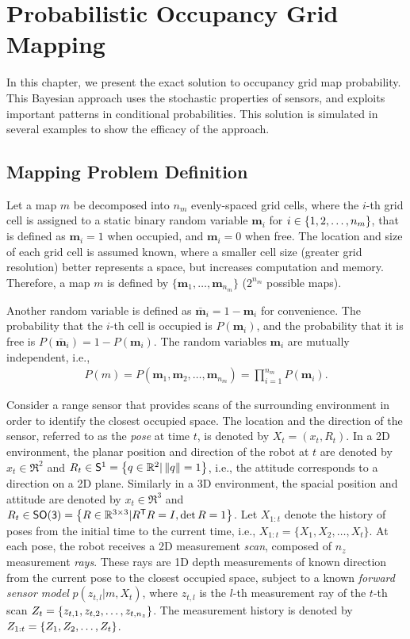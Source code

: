 
\chapter{Probabilistic Occupancy Grid Mapping} \label{chap:pogm}

In this chapter, we present the exact solution to occupancy grid map probability. This Bayesian approach uses the stochastic properties of sensors, and exploits important patterns in conditional probabilities. This solution is simulated in several examples to show the efficacy of the approach.

\section{Mapping Problem Definition}

Let a map $m$ be decomposed into $n_m$ evenly-spaced grid cells, where the $i$-th grid cell is assigned to a static binary random variable $\mathbf{m}_i$ for $i\in\left\{ 1,2,\ldots,n_m \right\}$, that is defined as $\mathbf{m}_i=1$ when occupied, and $\mathbf{m}_i=0$ when free. The location and size of each grid cell is assumed known, where a smaller cell size (greater grid resolution) better represents a space, but increases computation and memory. Therefore, a map $m$ is defined by $\{\mathbf{m}_1,\ldots, \mathbf{m}_{n_m}\}$ ($2^{n_{m}}$ possible maps).

Another random variable is defined as $\bar{\mathbf{m}}_i=1-\mathbf{m}_i$ for convenience. The probability that the $i$-th cell is occupied is $P(\mathbf{m}_i)$, and the probability that it is free is $P(\bar{\mathbf{m}}_i)=1-P(\mathbf{m}_i)$. The random variables $\mathbf{m}_i$ are mutually independent, i.e.,
\begin{align}
P(m)=P(\mathbf{m}_1,\mathbf{m}_2,\ldots,\mathbf{m}_{n_m})=\prod_{i=1}^{n_m}P(\mathbf{m}_i).
\end{align}

Consider a range sensor that provides scans of the surrounding environment in order to identify the closest occupied space. The location and the direction of the sensor, referred to as the \emph{pose} at time $t$, is denoted by $X_t=(x_t,R_t)$. In a 2D environment, the planar position and direction of the robot at $t$ are denoted by $x_t\in\Re^2$ and $R_t\in\mathsf{S}^1=\left\{ q\in\mathbb{R}^2|\left\| q \right\|=1 \right\}$, i.e., the attitude corresponds to a direction on a 2D plane. Similarly in a 3D environment, the spacial position and attitude are denoted by $x_t\in\Re^3$ and $R_t\in\mathsf{SO(3)}=\left\{ R\in\mathbb{R}^{3\times3}|R^{\mathsf{T}} R=I,\det{R}=1 \right\}$. Let $X_{1:t}$ denote the history of poses from the initial time to the current time, i.e., $X_{1:t}=\{X_1,X_2,\ldots, X_t\}$. At each pose, the robot receives a 2D measurement \emph{scan}, composed of $n_z$ measurement \emph{rays}. These rays are 1D depth measurements of known direction from the current pose to the closest occupied space, subject to a known \emph{forward sensor model} $p(z_{t,l}|m,X_t)$, where $z_{t,l}$ is the $l$-th measurement ray of the $t$-th scan $Z_t=\left\{ z_{t,1},z_{t,2},\ldots,z_{t,n_z} \right\}$. The measurement history is denoted by $Z_{1:t}=\left\{ Z_1,Z_2,\ldots,Z_t \right\}$. 

